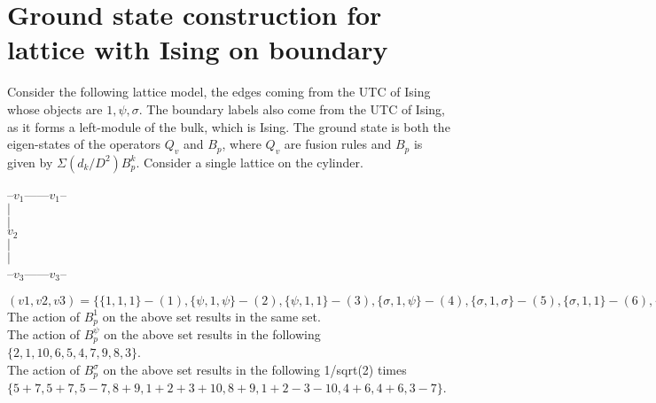 \section{Ground state construction for lattice with Ising on boundary}
    Consider the following lattice model, the edges coming from the UTC of Ising whose objects are $1, \psi, \sigma$. The boundary labels also come from the UTC of Ising, as it forms a left-module of the bulk,
which is Ising. The ground state is both the eigen-states of the operators $Q_{v}$ and $B_{p}$, where $Q_{v}$ are fusion rules and $B_{p}$ is given by $\varSigma (d_{k}/D^{2}) B_{p}^{k}$. Consider a single lattice on the
cylinder. 
\begin{center}
--$v_{1}$------$v_{1}$--\\
	   $|$\\
	   $|$\\
	 $v_{2}$\\
	   $|$\\
	   $|$	\\
--$v_{3}$------$v_{3}$--\\
\end{center}
$ (v1, v2, v3) = \{\{1,1,1\} - (1),\{\psi,1,\psi\} - (2),\{\psi,1,1\} - (3),\{\sigma,1,\psi\} - (4), \{\sigma,1,\sigma\} - (5), 
                   \{\sigma,1,1\} - (6),\{\sigma,\psi,\sigma\} - (7), \{\psi,1,\sigma\} - (8),\{1,1,\sigma\} - (9),\{1,1,\psi\}\ - (10)\}$ \\

The action of $B_{p}^{1}$ on the above set results in the same set. \\
The action of $B_{p}^{\psi}$ on the above set results in the following $\{2,1,10,6,5,4,7,9,8,3\}$.\\
The action of $B_{p}^{\sigma}$ on the above set results in the following 1/sqrt(2) times $\{5+7,5+7,5-7,8+9,1+2+3+10,8+9,1+2-3-10,4+6,4+6,3-7\}$.\\

